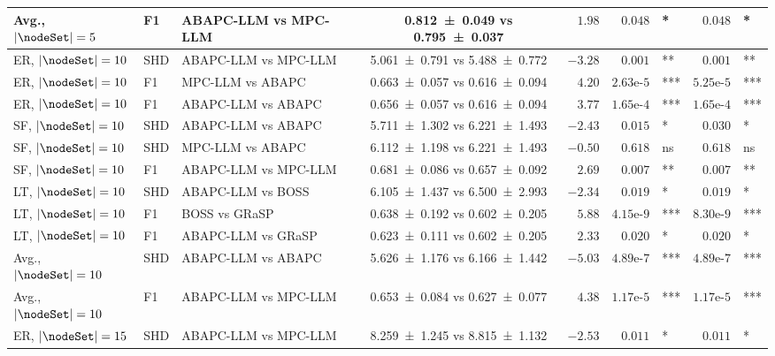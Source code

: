 \begin{table}[t]
{\begin{tabular}{ll l|c|r|rl|rl}
    Avg., $|\nodeSet|=5$ & F1 & ABAPC-LLM vs MPC-LLM & \num{0.812 +- 0.049} vs \num{0.795 +- 0.037} & $1.98$ & $0.048$ & \!\!\!* & $0.048$ & \!\!\!* \\
    \midrule
    ER, $|\nodeSet|=10$ & SHD & ABAPC-LLM vs MPC-LLM & \num{5.061 +- 0.791} vs \num{5.488 +- 0.772} & $-3.28$ & $0.001$ & \!\!\!** & $0.001$ & \!\!\!** \\
    ER, $|\nodeSet|=10$ & F1 & MPC-LLM vs ABAPC & \num{0.663 +- 0.057} vs \num{0.616 +- 0.094} & $4.20$ & $2.63\text{e-}5$ & \!\!\!*** & $5.25\text{e-}5$ & \!\!\!*** \\
    ER, $|\nodeSet|=10$ & F1 & ABAPC-LLM vs ABAPC & \num{0.656 +- 0.057} vs \num{0.616 +- 0.094} & $3.77$ & $1.65\text{e-}4$ & \!\!\!*** & $1.65\text{e-}4$ & \!\!\!*** \\
    \midrule
    SF, $|\nodeSet|=10$ & SHD & ABAPC-LLM vs ABAPC & \num{5.711 +- 1.302} vs \num{6.221 +- 1.493} & $-2.43$ & $0.015$ & \!\!\!* & $0.030$ & \!\!\!* \\
    SF, $|\nodeSet|=10$ & SHD & MPC-LLM vs ABAPC & \num{6.112 +- 1.198} vs \num{6.221 +- 1.493} & $-0.50$ & $0.618$ & \!\!\!ns & $0.618$ & \!\!\!ns \\
    SF, $|\nodeSet|=10$ & F1 & ABAPC-LLM vs MPC-LLM & \num{0.681 +- 0.086} vs \num{0.657 +- 0.092} & $2.69$ & $0.007$ & \!\!\!** & $0.007$ & \!\!\!** \\
    \midrule
    LT, $|\nodeSet|=10$ & SHD & ABAPC-LLM vs BOSS & \num{6.105 +- 1.437} vs \num{6.500 +- 2.993} & $-2.34$ & $0.019$ & \!\!\!* & $0.019$ & \!\!\!* \\
    LT, $|\nodeSet|=10$ & F1 & BOSS vs GRaSP & \num{0.638 +- 0.192} vs \num{0.602 +- 0.205} & $5.88$ & $4.15\text{e-}9$ & \!\!\!*** & $8.30\text{e-}9$ & \!\!\!*** \\
    LT, $|\nodeSet|=10$ & F1 & ABAPC-LLM vs GRaSP & \num{0.623 +- 0.111} vs \num{0.602 +- 0.205} & $2.33$ & $0.020$ & \!\!\!* & $0.020$ & \!\!\!* \\
    \midrule
    Avg., $|\nodeSet|=10$ & SHD & ABAPC-LLM vs ABAPC & \num{5.626 +- 1.176} vs \num{6.166 +- 1.442} & $-5.03$ & $4.89\text{e-}7$ & \!\!\!*** & $4.89\text{e-}7$ & \!\!\!*** \\
    Avg., $|\nodeSet|=10$ & F1 & ABAPC-LLM vs MPC-LLM & \num{0.653 +- 0.084} vs \num{0.627 +- 0.077} & $4.38$ & $1.17\text{e-}5$ & \!\!\!*** & $1.17\text{e-}5$ & \!\!\!*** \\
    \midrule
    ER, $|\nodeSet|=15$ & SHD & ABAPC-LLM vs MPC-LLM & \num{8.259 +- 1.245} vs \num{8.815 +- 1.132} & $-2.53$ & $0.011$ & \!\!\!* & $0.011$ & \!\!\!* \\

\end{tabular}}
\end{table}
